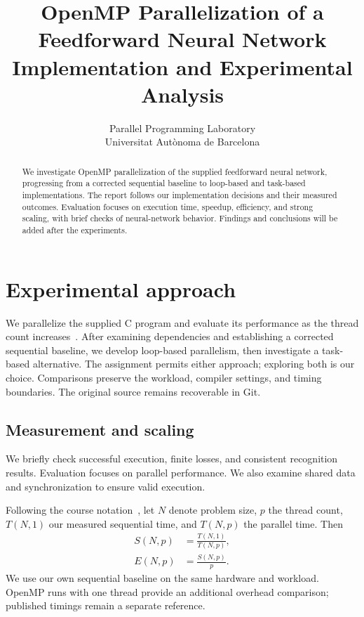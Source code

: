 \documentclass[10pt,a4paper,twocolumn]{article}
\title{\textbf{OpenMP Parallelization of a\\Feedforward Neural Network}\\[0.5em]
  \large Implementation and Experimental Analysis}
\author{Parallel Programming Laboratory\\Universitat Aut\`onoma de Barcelona}
\date{}
\begin{document}
\maketitle

\begin{abstract}
We investigate OpenMP parallelization of the supplied feedforward neural
network, progressing from a corrected sequential baseline to loop-based and
task-based implementations. The report follows our implementation decisions
and their measured outcomes. Evaluation focuses on execution time, speedup,
efficiency, and strong scaling, with brief checks of neural-network behavior.
Findings and conclusions will be added after the experiments.
\end{abstract}

\section{Experimental approach}
\label{sec:approach}

We parallelize the supplied C program and evaluate its performance as the
thread count increases~\cite{assignment}. After examining dependencies and
establishing a corrected sequential baseline, we develop loop-based
parallelism, then investigate a task-based alternative. The assignment
permits either approach; exploring both is our choice. Comparisons preserve
the workload, compiler settings, and timing boundaries. The original source
remains recoverable in Git.

\subsection{Measurement and scaling}

We briefly check successful execution, finite losses, and consistent
recognition results. Evaluation focuses on parallel performance. We also
examine shared data and synchronization to ensure valid execution.

Following the course notation~\cite{performance-metrics}, let $N$ denote
problem size, $p$ the thread count, $T(N,1)$ our measured sequential time,
and $T(N,p)$ the parallel time. Then
\begin{align}
  S(N,p) &= \frac{T(N,1)}{T(N,p)}, \\
  E(N,p) &= \frac{S(N,p)}{p}.
\end{align}
We use our own sequential baseline on the same hardware and workload.
OpenMP runs with one thread provide an additional overhead comparison;
published timings remain a separate reference.
\end{document}
